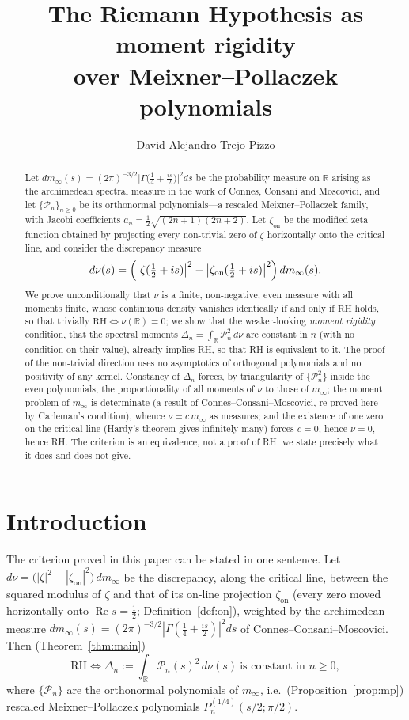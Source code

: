 \documentclass[11pt]{amsart}
\title[RH as Moment Rigidity]{The Riemann Hypothesis as moment rigidity\\
over Meixner--Pollaczek polynomials}
\author{David Alejandro Trejo Pizzo}
\theoremstyle{definition}
\theoremstyle{remark}
\newcommand{\RH}{\mathrm{RH}}
\newcommand{\bbR}{\mathbb{R}}
\newcommand{\minf}{m_\infty}
\newcommand{\zon}{\zeta_{\mathrm{on}}}
\DeclareMathOperator{\Real}{Re}
\begin{document}
\begin{abstract}
Let $d\minf(s)=(2\pi)^{-3/2}\bigl|\Gamma\bigl(\tfrac14+\tfrac{is}{2}\bigr)\bigr|^{2}ds$
be the probability measure on $\bbR$ arising as the archimedean spectral
measure in the work of Connes, Consani and Moscovici, and let
$\{\mathcal P_n\}_{n\ge0}$ be its orthonormal polynomials---a rescaled
Meixner--Pollaczek family, with Jacobi coefficients
$a_n=\tfrac12\sqrt{(2n+1)(2n+2)}$. Let $\zon$ be the modified zeta function
obtained by projecting every non-trivial zero of $\zeta$ horizontally onto
the critical line, and consider the discrepancy measure
\[
d\nu(s)=\Bigl(\bigl|\zeta(\tfrac12+is)\bigr|^{2}
-\bigl|\zon(\tfrac12+is)\bigr|^{2}\Bigr)\,d\minf(s).
\]
We prove unconditionally that $\nu$ is a finite, non-negative, even measure
with all moments finite, whose continuous density vanishes identically if
and only if $\RH$ holds, so that trivially $\RH\iff\nu(\bbR)=0$; we show
that the weaker-looking \emph{moment rigidity} condition, that the spectral
moments $\Delta_n=\int_\bbR\mathcal P_n^{2}\,d\nu$ are constant in $n$ (with
no condition on their value), already implies RH, so that RH is equivalent
to it. The proof of
the non-trivial direction uses no asymptotics of orthogonal polynomials and
no positivity of any kernel. Constancy of $\Delta_n$ forces, by
triangularity of $\{\mathcal P_n^{2}\}$ inside the even polynomials, the
proportionality of all moments of $\nu$ to those of $\minf$; the moment problem of $\minf$ is determinate (a result of
Connes--Consani--Moscovici, re-proved here by Carleman's condition), whence $\nu=c\,\minf$ as measures; and the existence of one zero on the critical line
(Hardy's theorem gives infinitely many) forces $c=0$, hence $\nu=0$,
hence RH. The criterion is an equivalence, not a proof of RH; we state
precisely what it does and does not give.
\end{abstract}

\maketitle

\tableofcontents
\newpage

\section{Introduction}\label{sec:intro}

The criterion proved in this paper can be stated in one sentence. Let
$d\nu=\bigl(|\zeta|^{2}-|\zon|^{2}\bigr)\,d\minf$ be the discrepancy, along
the critical line, between the squared modulus of $\zeta$ and that of its
on-line projection $\zon$ (every zero moved horizontally onto
$\Real s=\tfrac12$; Definition~\ref{def:on}), weighted by the archimedean
measure $d\minf(s)=(2\pi)^{-3/2}|\Gamma(\tfrac14+\tfrac{is}{2})|^{2}ds$ of
Connes--Consani--Moscovici. Then (Theorem~\ref{thm:main})
\[
\boxed{\;\RH\iff
\Delta_n:=\int_{\bbR}\mathcal P_n(s)^{2}\,d\nu(s)
\ \text{is constant in }n\ge0,\;}
\]
where $\{\mathcal P_n\}$ are the orthonormal polynomials of $\minf$, i.e.\
(Proposition~\ref{prop:mp}) rescaled Meixner--Pollaczek polynomials
$P^{(1/4)}_n(s/2;\pi/2)$.
\end{document}
